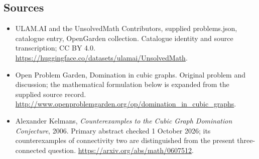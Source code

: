\documentclass[11pt,a4paper]{article}
\begin{document}
\subsection{Sources}
\begin{itemize}
\item[S1] ULAM.AI and the UnsolvedMath Contributors, supplied problems.json, catalogue entry, OpenGarden collection. Catalogue identity and source transcription; CC BY 4.0.
\url{https://huggingface.co/datasets/ulamai/UnsolvedMath}.
\item[S2] Open Problem Garden, Domination in cubic graphs. Original problem and discussion; the mathematical formulation below is expanded from the supplied source record.
\url{http://www.openproblemgarden.org/op/domination_in_cubic_graphs}.

\item[R1] Alexander Kelmans, \emph{Counterexamples to the Cubic Graph
Domination Conjecture}, 2006. Primary abstract checked 1 October 2026;
its counterexamples of connectivity two are distinguished from the
present three-connected question.
\url{https://arxiv.org/abs/math/0607512}.

\end{itemize}
\end{document}

